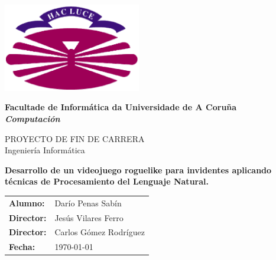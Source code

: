 %
%

%

\begin{titlepage}

	\begin{center}

		\includegraphics[width=6cm]{./eps/logo-udc.pdf}
		\vspace{2cm}

		{\Large{\textbf{Facultade de Informática da Universidade de A Coruña}}}
		\\
		{\it \large{\textbf{Computación}}}
		\vspace{1cm}

		{\large PROYECTO DE FIN DE CARRERA\\Ingeniería Informática}
		\vspace{1cm}

		\textbf{\Large Desarrollo de un videojuego roguelike para invidentes aplicando técnicas de Procesamiento del Lenguaje Natural.}
		\vspace{7cm}
	\end{center}

	\begin{flushright}
		\begin{tabular}{ll}
			\large{\textbf{Alumno:}}	&
			\large{Darío Penas Sabín} \\

			\large{\textbf{Director:}}	&
			\large{Jesús Vilares Ferro} \\

			\large{\textbf{Director:}}	&
			\large{Carlos Gómez Rodríguez} \\

			\large{\textbf{Fecha:}}	&
			\large{\today} \\
		\end{tabular}
	\end{flushright}

\end{titlepage}
